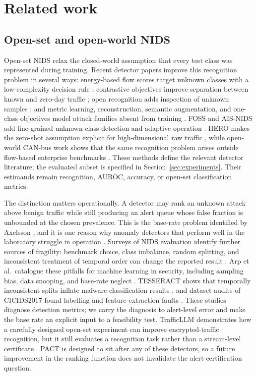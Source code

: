 \documentclass[a4paper,fleqn]{cas-dc}
\newcommand{\PACT}{PACT\xspace}
\begin{document}
\section{Related work}
\label{sec:related}

\subsection{Open-set and open-world NIDS}
Open-set NIDS relax the closed-world assumption that every test class was represented during training. Recent detector papers improve this recognition problem in several ways: energy-based flow scores target unknown classes with a low-complexity decision rule \cite{souza2025efc}; contrastive objectives improve separation between known and zero-day traffic \cite{wilkie2026closr,aaai2023contrastive}; open recognition adds inspection of unknown samples \cite{du2025ori}; and metric learning, reconstruction, semantic augmentation, and one-class objectives model attack families absent from training \cite{docpp2023,renoir2021,patcog2023bridge,patcog2024semantic,uddin2024usfad}. FOSS and AIS-NIDS add fine-grained unknown-class detection and adaptive operation \cite{zhao2024foss,farrukh2024ais}. HERO makes the zero-shot assumption explicit for high-dimensional raw traffic \cite{cevallos2025hero}, while open-world CAN-bus work shows that the same recognition problem arises outside flow-based enterprise benchmarks \cite{mnet2024canopen}. These methods define the relevant detector literature; the evaluated subset is specified in Section~\ref{sec:experiments}. Their estimands remain recognition, AUROC, accuracy, or open-set classification metrics.

The distinction matters operationally. A detector may rank an unknown attack above benign traffic while still producing an alert queue whose false fraction is unbounded at the chosen prevalence. This is the base-rate problem identified by Axelsson \cite{axelsson2000baserate}, and it is one reason why anomaly detectors that perform well in the laboratory struggle in operation \cite{sommer2010outside}. Surveys of NIDS evaluation identify further sources of fragility: benchmark choice, class imbalance, random splitting, and inconsistent treatment of temporal order can change the reported result \cite{almeida2025survey,mohammadi2020survey,khraisat2019survey,csa2024iot}. Arp et al.\ catalogue these pitfalls for machine learning in security, including sampling bias, data snooping, and base-rate neglect \cite{arp2022dos}. TESSERACT shows that temporally inconsistent splits inflate malware-classification results \cite{pendlebury2019tesseract}, and dataset audits of CICIDS2017 found labelling and feature-extraction faults \cite{cicids2021case}. These studies diagnose detection metrics; we carry the diagnosis to alert-level error and make the base rate an explicit input to a feasibility test. TrafficLLM demonstrates how a carefully designed open-set experiment can improve encrypted-traffic recognition, but it still evaluates a recognition task rather than a stream-level certificate \cite{comnet2025trafficllm}. \PACT is designed to sit after any of these detectors, so a future improvement in the ranking function does not invalidate the alert-certification question.
\end{document}
